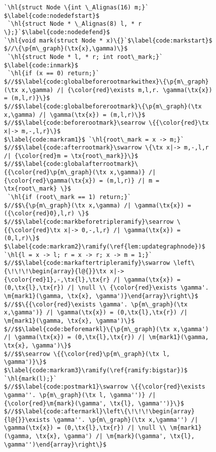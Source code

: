 \renewcommand{\tx}[1]{\scriptsize {\text{#1}}}


\begin{figure}[t]
  \begin{lstlisting}[multicols=2]
`\hl{struct Node \{int \_Alignas(16) m;}` $\label{code:nodedefstart}$
 `\hl{struct Node * \_Alignas(8) l, * r \};}`$\label{code:nodedefend}$
`\hl{void mark(struct Node * x)\{}`$\label{code:markstart}$
$//\{\p{m\_graph}(\tx{x},\gamma)\}$
 `\hl{struct Node * l, * r; int root\_mark;}` $\label{code:inmark}$
 `\hl{if (x == 0) return;}`
$//$$\label{code:globalbeforerootmarkwithex}\{\p{m\_graph}(\tx x,\gamma) /| {\color{red}\exists m,l,r. \gamma(\tx{x}) = (m,l,r)}\}$
$//$$\label{code:globalbeforerootmark}\{\p{m\_graph}(\tx x,\gamma) /| \gamma(\tx{x}) = (m,l,r)\}$
$//$$\label{code:beforerootmark}\searrow \{{\color{red}\tx x|-> m,-,l,r}\}$
$\label{code:markram1}$ `\hl{root\_mark = x -> m;}`
$//$$\label{code:afterrootmark}\swarrow \{\tx x|-> m,-,l,r /| {\color{red}m = \tx{root\_mark}}\}$
$//$$\label{code:globalafterrootmark}\{{\color{red}\p{m\_graph}(\tx x,\gamma)} /| {\color{red}\gamma(\tx{x}) = (m,l,r)} /| m = \tx{root\_mark} \}$
 `\hl{if (root\_mark == 1) return;}`
$//$$\{\p{m\_graph}(\tx x,\gamma) /| \gamma(\tx{x}) = ({\color{red}0},l,r) \}$
$//$$\label{code:markbeforetripleramify}\searrow \{{\color{red}\tx x|-> 0,-,l,r} /| \gamma(\tx{x}) = (0,l,r)\}$
$\label{code:markram2}\ramify(\ref{lem:updategraphnode})$ `\hl{l = x -> l; r = x -> r; x -> m = 1;}`
$//$$\label{code:markaftertripleramify}\swarrow \left\{\!\!\!\begin{array}{l@{}}\tx x|-> {\color{red}1},-,\tx{l},\tx{r} /| \gamma(\tx{x}) = (0,\tx{l},\tx{r}) /| \null \\ {\color{red}\exists \gamma'. \m{mark1}(\gamma, \tx{x}, \gamma')}\end{array}\right\}$
$//$$\{{\color{red}\exists \gamma'. \p{m\_graph}(\tx x,\gamma')} /| \gamma(\tx{x}) = (0,\tx{l},\tx{r}) /| \m{mark1}(\gamma, \tx{x}, \gamma')\}$
$//$$\label{code:beforemarkl}\{\p{m\_graph}(\tx x,\gamma') /| \gamma(\tx{x}) = (0,\tx{l},\tx{r}) /| \m{mark1}(\gamma, \tx{x}, \gamma')\}$
$//$$\searrow \{{\color{red}\p{m\_graph}(\tx l, \gamma')}\}$
$\label{code:markram3}\ramify(\ref{ramify:bigstar})$ `\hl{mark(l);}`
$//$$\label{code:postmark1}\swarrow \{{\color{red}\exists \gamma''. \p{m\_graph}(\tx l, \gamma'')} /| {\color{red}\m{mark}(\gamma', \tx{l}, \gamma'')}\}$
$//$$\label{code:aftermarkl}\left\{\!\!\!\begin{array}{l@{}}\exists \gamma''. \p{m\_graph}(\tx x,\gamma'') /| \gamma(\tx{x}) = (0,\tx{l},\tx{r}) /| \null \\ \m{mark1}(\gamma, \tx{x}, \gamma') /| \m{mark}(\gamma', \tx{l}, \gamma'')\end{array}\right\}$

\end{lstlisting}
\end{figure}
